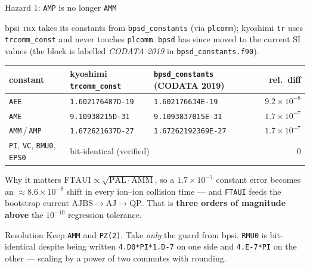 \documentclass[10pt,aspectratio=169]{beamer}
\newcommand{\C}[1]{\texttt{\small #1}}          %
\begin{document}
\begin{frame}{Hazard 1: \C{AMP} is no longer \C{AMM}}

bpsi \textsc{trx} takes its constants from \C{bpsd\_constants} (via \C{plcomm}); kyoshimi \C{tr} uses
\C{trcomm\_const} and never touches \C{plcomm}. \C{bpsd} has since moved to the current SI values
(the block is labelled \emph{CODATA 2019} in \C{bpsd\_constants.f90}).

\vspace{0.5em}
\begin{center}
\small
\begin{tabular}{@{}lllr@{}}
\toprule
constant & kyoshimi \C{trcomm\_const} & \C{bpsd\_constants} (CODATA 2019) & rel.\ diff \\
\midrule
\C{AEE}       & \C{1.602176487D-19}  & \C{1.602176634E-19}   & $9.2\times10^{-8}$ \\
\C{AME}       & \C{9.10938215D-31}   & \C{9.1093837015E-31}  & $1.7\times10^{-7}$ \\
\C{AMM}\,/\,\C{AMP} & \C{1.672621637D-27} & \C{1.67262192369E-27} & $1.7\times10^{-7}$ \\
\midrule
\C{PI}, \C{VC}, \C{RMU0}, \C{EPS0} & \multicolumn{2}{l}{bit-identical (verified)} & $0$ \\
\bottomrule
\end{tabular}
\end{center}

\vspace{0.4em}
\begin{block}{Why it matters}
$\mathrm{FTAUI} \propto \sqrt{\mathrm{PAL}\cdot\mathrm{AMM}}$, so a $1.7\times10^{-7}$ constant error
becomes an $\approx 8.6\times10^{-8}$ shift in every ion--ion collision time --- and \C{FTAUI} feeds
the bootstrap current $\mathrm{AJBS}\to\mathrm{AJ}\to\mathrm{QP}$.
That is \textbf{three orders of magnitude above} the $10^{-10}$ regression tolerance.
\end{block}

\begin{exampleblock}{Resolution}
Keep \C{AMM} and \C{PZ(2)}. Take \emph{only} the guard from bpsi. \C{RMU0} is bit-identical despite being
written \C{4.D0*PI*1.D-7} on one side and \C{4.E-7*PI} on the other --- scaling by a power of two commutes
with rounding.
\end{exampleblock}
\end{frame}
\end{document}
